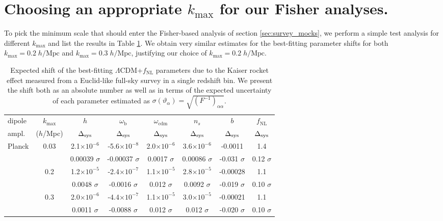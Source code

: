 \documentclass[a4paper,11pt]{article}
\begin{document}
\appendix
\section{Choosing an appropriate $k_\mathrm{max}$ for our Fisher analyses.}
\label{app:1}
To pick the minimum scale that should enter the Fisher-based analysis of section \ref{sec:survey_mocks}, we perform a simple test analysis for different $k_\mathrm{max}$ and list the results in Table \ref{tab:Euclid_FS_shifts}.  We obtain very similar estimates for the best-fitting parameter shifts for both $k_\mathrm{max}=0.2\;h/\mathrm{Mpc}$ and $k_\mathrm{max}=0.3\;h/\mathrm{Mpc}$, justifying our choice of  $k_\mathrm{max}=0.2\;h/\mathrm{Mpc}$. 
\begin{table}[ht]
    \centering
    \begin{tabular}{|l|c|c|c|c|c|c|c|}
        \hline dipole & $k_\mathrm{max}$ & $h$ & $\omega_\mathrm{b}$ & $\omega_\mathrm{cdm}$ & $n_s$ & $b$ & $f_\mathrm{NL}$ \\
        ampl. & ($h$/Mpc)&$\Delta_{\rm sys}$&$\Delta_{\rm sys}$&$\Delta_{\rm sys}$&$\Delta_{\rm sys}$&$\Delta_{\rm sys}$&$\Delta_{\rm sys}$\\ \hline\hline
        Planck & 0.03  &  2.1$\times 10^{-6}$
 &  -5.6$\times 10^{-8}$
 &  2.0$\times 10^{-6}$
 &  3.6$\times 10^{-6}$
 &  -0.0011
 &  1.4\\
        &  &  0.00039 $\sigma$
 &  -0.00037 $\sigma$
 &  0.0017 $\sigma$
 &  0.00086 $\sigma$
 &  -0.031 $\sigma$
 &  0.12 $\sigma$\\
        & 0.2 &  1.2$\times 10^{-5}$
 &  -2.4$\times 10^{-7}$
 &  1.1$\times 10^{-5}$
 &  2.8$\times 10^{-5}$
 &  -0.00028
 &  1.1
\\
          & & 0.0048 $\sigma$
 &  -0.0016 $\sigma$
 &  0.012 $\sigma$
 &  0.0092 $\sigma$
 &  -0.019 $\sigma$
 &  0.10 $\sigma$\\
        & 0.3  &  2.0$\times 10^{-6}$
 &  -4.4$\times 10^{-7}$
 &  1.1$\times 10^{-5}$
 &  3.0$\times 10^{-5}$
 &  -0.00021
 &  1.1\\
        &  &  0.0011 $\sigma$
 &  -0.0088 $\sigma$
 &  0.012 $\sigma$
 &  0.012 $\sigma$
 &  -0.020 $\sigma$
 &  0.10 $\sigma$\\\hline
    \end{tabular}
    \caption{Expected shift of the best-fitting $\Lambda$CDM+$f_\mathrm{NL}$ parameters due to the Kaiser rocket effect measured from a Euclid-like full-sky survey in a single redshift bin. We present the shift both as an absolute number as well as in terms of the expected uncertainty of each parameter estimated as $\sigma(\vartheta_\alpha)=\sqrt{(F^{-1})_{\alpha\alpha}}$.}
    \label{tab:Euclid_FS_shifts}
\end{table}
\end{document}
